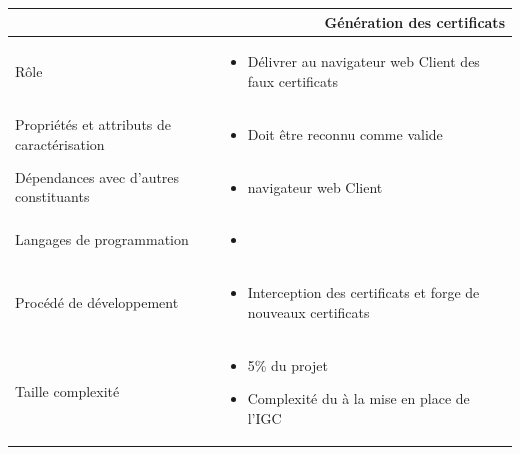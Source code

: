 \documentclass[a4paper,11pt,french]{article}
\begin{document}
\begin{center}
        \vspace*{0.7cm}
        \begin{tabularx}{16cm}{|l|X|}
        \hline
        \multicolumn{2}{|r|}{\textbf{Génération des certificats}}\\
        \hline
        R\^ole &  \begin{itemize}\item Délivrer au navigateur web Client des faux certificats\end{itemize}\\
        \hline
        Propriétés et attributs de caractérisation & \begin{itemize} \item Doit être reconnu comme valide \end{itemize}\\
        \hline
        Dépendances avec d'autres constituants & \begin{itemize}\item navigateur web Client\end{itemize}\\
        \hline
        Langages de programmation & \begin{itemize} \item  \end{itemize}\\
        \hline
        Procédé de développement & \begin{itemize}\item Interception des certificats et forge de nouveaux certificats\end{itemize}\\
        \hline
        Taille complexité & \begin{itemize}\item 5\% du projet \item Complexité du à la mise en place de l'IGC\end{itemize}\\
        \hline
        \end{tabularx}
\end{center}

\end{document}
